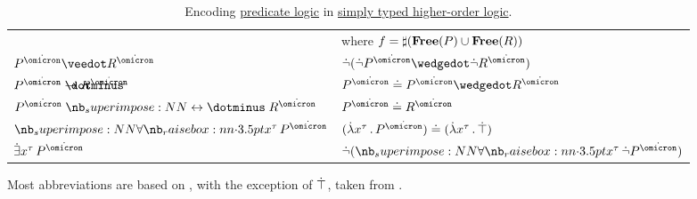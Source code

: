 \begin{definition}
\begin{table}
\begin{center}
\begin{tabular}{l l}
                                                            & \quad where \( f = \sharp(\op*{Free}(P) \cup \op*{Free}(R)) \)                                                                                                                                                                        \\
        \( P^{\syn\omicron} \synvee R^{\syn\omicron} \)     & \( \synneg (\synneg P^{\syn\omicron} \synwedge \synneg R^{\syn\omicron}) \)                                                                                                                                                           \\
        \( P^{\syn\omicron} \synimplies R^{\syn\omicron} \) & \( P^{\syn\omicron} \syneq P^{\syn\omicron} \synwedge R^{\syn\omicron} \)                                                                                                                                                             \\
        \( P^{\syn\omicron} \syniff R^{\syn\omicron} \)     & \( P^{\syn\omicron} \syneq R^{\syn\omicron} \)                                                                                                                                                                                        \\
        \( \qforall {x^\tau} P^{\syn\omicron} \)            & \( (\qabs {x^\tau} P^{\syn\omicron}) \syneq (\qabs {x^\tau} \syntop) \)                                                                                                                                                               \\
        \( \qexists {x^\tau} P^{\syn\omicron} \)            & \( \synneg (\qforall {x^\tau} \synneg P^{\syn\omicron}) \)                                                                                                                                                                            \\
        \bottomrule
      \end{tabular}
    \end{center}

    \caption{Encoding \hyperref[rem:predicate_logic]{predicate logic} in \hyperref[def:simply_typed_hol]{simply typed higher-order logic}.}\label{tab:def:simply_typed_hol_abbreviations}
  \end{table}
\end{definition}
\begin{comments}
  \item Most abbreviations are based on , with the exception of \( \dot{\top} \), taken from .
\end{comments}

